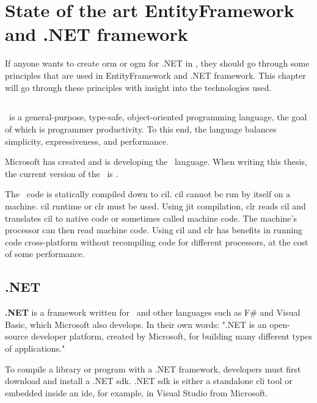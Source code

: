 \chapter {State of the art EntityFramework and .NET framework}

If anyone wants to create \acrshort{orm} or \acrshort{ogm} for .NET in \CS, they should go through some principles that are used in EntityFramework and .NET framework.
This chapter will go through these principles with insight into the technologies used.

\section {\CS}
\CS\ is a general-purpose, type-safe, object-oriented programming language, the goal of which is programmer productivity.
To this end, the language balances simplicity, expressiveness, and performance. \cite{albahari_c_2019}

Microsoft has created and is developing the \CS\ language. When writing this thesis, the current version of the \CS\ is .

The \CS\ code is statically compiled down to \acrlong{cil}. \acrshort{cil} cannot be run by itself on a machine.
\acrshort{cil} runtime or \acrfull{clr} must be used.
Using \acrfull{jit} compilation, \acrshort{clr} reads \acrshort{cil} and translates \acrshort{cil} to native code or sometimes called machine code.
The machine's processor can then read machine code. Using \acrshort{cil} and \acrshort{clr} has benefits in running code cross-platform without recompiling code for different processors, at the cost of some performance. \cite{rodenburg_code_2021}

\section {.NET}

\textbf{.NET} is a framework written for \CS\ and other languages such as F\# and Visual Basic, which Microsoft also develops.
In their own words: ".NET is an open-source developer platform, created by Microsoft, for building many different types of applications." \cite{microsoft_what_nodate}

To compile a library or program with a .NET framework, developers must first download and install a .NET \acrfull{sdk}.
.NET \acrfull{sdk} is either a standalone \acrfull{cli} tool or embedded inside an \acrshort{ide}, for example, in Visual Studio from Microsoft.


